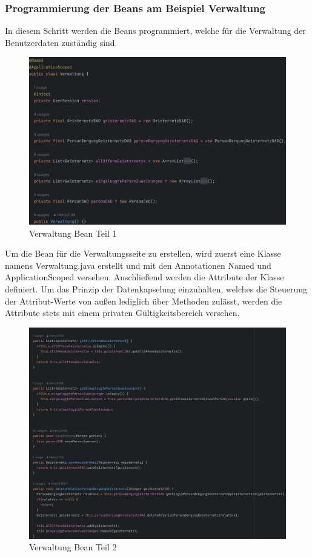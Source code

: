 \documentclass[11pt]{article}
\begin{document}
    \subsubsection{Programmierung der Beans am Beispiel Verwaltung}
    In diesem Schritt werden die Beans programmiert, welche für die Verwaltung der Benutzerdaten zuständig sind.
    \begin{figure}[H]
        \centering
        \includegraphics[width=\textwidth]{abbildungen/Verwaltung-Bean-Teil-1.png}
        \caption{Verwaltung Bean Teil 1}
        \label{verwaltung-bean-teil-1}
    \end{figure} 
    Um die Bean für die Verwaltungsseite zu erstellen, wird zuerst eine Klasse namens Verwaltung.java erstellt und mit den Annotationen Named und ApplicationScoped versehen. 
    Anschließend werden die Attribute der Klasse definiert. Um das Prinzip der Datenkapselung einzuhalten, welches die Steuerung der Attribut-Werte von außen
    lediglich über Methoden zulässt, werden die Attribute stets mit einem privaten Gültigkeitsbereich versehen.
    \begin{figure}[H]
        \centering
        \includegraphics[width=\textwidth]{abbildungen/Verwaltung-Bean-Teil-2.png}
        \caption{Verwaltung Bean Teil 2}
        \label{verwaltung-bean-teil-2}
    \end{figure} 
\end{document}

